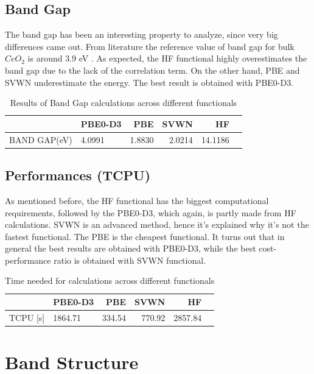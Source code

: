 \documentclass{article}
\begin{document}
\subsection{Band Gap}

The band gap has been an interesting property to analyze, since very big differences came out.
From literature the reference value of band gap for bulk $CeO_2$ is around 3.9 eV \cite{ceo2_band_gap}.
As expected, the HF functional highly overestimates the band gap due to the lack of the correlation term. On the other hand, PBE and SVWN underestimate the energy. The best result is obtained with PBE0-D3. 

\begin{table}[H]
	\centering
	\begin{tabular}{llrrrr}
		\toprule
		 & PBE0-D3 & PBE & SVWN & HF \\
		\midrule
		BAND GAP(eV) & 4.0991 & 1.8830 & 2.0214 & 14.1186 \\
	\end{tabular}	
	\caption{Results of Band Gap calculations across different functionals}
	\label{tab:band_gap}
\end{table}

\subsection{Performances (TCPU)}

As mentioned before, the HF functional has the biggest computational requirements, followed by the PBE0-D3, which again, is partly made from HF calculations. SVWN is an advanced method, hence it's explained why it's not the fastest functional. The PBE is the cheapest functional. It turns out that in general the best results are obtained with PBE0-D3, while the best cost-performance ratio is obtained with SVWN functional.

\begin{table}[H]
	\centering
	\begin{tabular}{llrrrr}
		\toprule
		 & PBE0-D3 & PBE & SVWN & HF \\
		\midrule
		TCPU [s] & 1864.71 & 334.54 & 770.92 & 2857.84 \\
	\end{tabular}	
	\caption{Time needed for calculations across different functionals}
	\label{tab:TCPU}
\end{table}

\newpage
\section{Band Structure}
\end{document}
